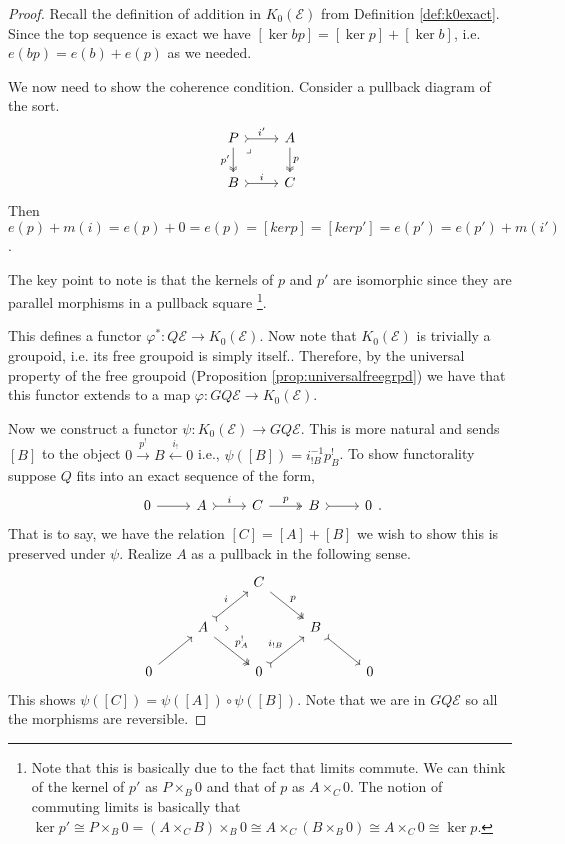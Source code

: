 \documentclass[12pt]{report}
\numberwithin{equation}{section}
\begin{document}
\begin{proof}
			Recall the definition of addition in \( K_0(\mathcal{E}) \) from Definition \ref{def:k0exact}. Since the top sequence is exact we have \( [\ker bp]=[\ker p]+[\ker b] \), i.e. \( e(bp)=e(b)+e(p) \) as we needed.
			
			We now need to show the coherence condition. Consider a pullback diagram of the sort.
			\[\begin{tikzcd}
				P & A \\
				B & C
				\arrow["{i'}", tail, from=1-1, to=1-2]
				\arrow["{p'}"', two heads, from=1-1, to=2-1]
				\arrow["\lrcorner"{anchor=center, pos=0.125}, draw=none, from=1-1, to=2-2]
				\arrow["p", two heads, from=1-2, to=2-2]
				\arrow["i", tail, from=2-1, to=2-2]
			\end{tikzcd}\]
			Then \( e(p)+m(i)=e(p)+0=e(p)=[ker p]=[ker p']=e(p')=e(p')+m(i') \).
			
			The key point to note is that the kernels of \( p \) and \( p' \) are isomorphic since they are parallel morphisms in a pullback square \footnote{Note that this is basically due to the fact that limits commute. We can think of the kernel of \( p' \) as \( P\times_B 0 \) and that of \( p \) as \( A \times_C 0 \). The notion of commuting limits is basically that \( \ker p' \cong P\times_B 0 =(A \times_C B) \times_B 0 \cong A \times_C (B \times_B 0) \cong A \times_C 0 \cong \ker p\).}.
			
			This defines a functor \( \varphi^*: Q \mathcal{E} \to K_0(\mathcal{E}) \). Now note that \( K_0(\mathcal{E}) \) is trivially a groupoid, i.e. its free groupoid is simply itself.. Therefore, by the universal property of the free groupoid (Proposition \ref{prop:universalfreegrpd}) we have that this functor extends to a map \( \varphi: G Q \mathcal{E} \to K_0(\mathcal{E}) \).	
			
			Now we construct a functor \( \psi: K_0(\mathcal{E}) \to G Q \mathcal{E}\). This is more natural and sends \( [B] \) to the object \( 0 \xrightarrow{p^!}B \xleftarrow{i_!}0\) i.e., \( \psi([B])=i^{-1}_{!B}p^!_B \). To show functorality suppose \( Q \) fits into an exact sequence of the form,
			\[\begin{tikzcd}
				0 & A & C & B & 0
				\arrow[from=1-1, to=1-2]
				\arrow["i", tail, from=1-2, to=1-3]
				\arrow["p", two heads, from=1-3, to=1-4]
				\arrow[tail, from=1-4, to=1-5]
			\end{tikzcd}.\]
			That is to say, we have the relation \( [C]=[A]+[B] \) we wish to show this is preserved under \( \psi \).
			Realize \( A \) as a pullback in the following sense.
			\[\begin{tikzcd}
				&& C \\
				& A && B \\
				0 && 0 && 0
				\arrow["p", two heads, from=1-3, to=2-4]
				\arrow["i", tail, from=2-2, to=1-3]
				\arrow["\lrcorner"{anchor=center, pos=0.125, rotate=45}, draw=none, from=2-2, to=2-4]
				\arrow["{p^!_A}", two heads, from=2-2, to=3-3]
				\arrow[tail, from=2-4, to=3-5]
				\arrow[from=3-1, to=2-2]
				\arrow["{i_{!B}}", tail, from=3-3, to=2-4]
			\end{tikzcd}\]
			This shows \( \psi([C])=\psi([A])\circ\psi([B]) \). Note that we are in \( GQ \mathcal{E} \) so all the morphisms are reversible.
				

\end{proof}
\end{document}
